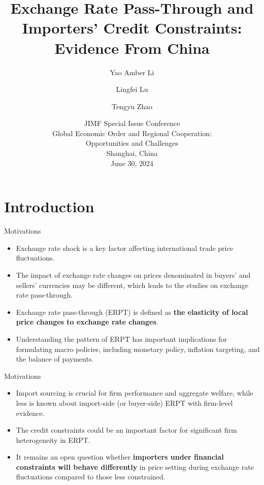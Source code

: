 \documentclass[10pt]{beamer}
\title[ERPT]{Exchange Rate Pass-Through and Importers' Credit Constraints: Evidence From China}
\author[Li \& Lu]{Yao Amber Li\inst{*} \and Lingfei Lu\inst{*} \and Tengyu Zhao\inst{*}}
\institute[2024]{\inst{*} \small The Hong Kong University of Science and Technology}
\date{JIMF Special Issue Conference \\ Global Economic Order and Regional Cooperation:\\ Opportunities and Challenges \\ \vspace{3mm} Shanghai, China \\ \vspace{3mm} June 30, 2024 }
\begin{document}
	
\begin{frame}
    \maketitle
    \centering
\end{frame}


\section{Introduction}

\begin{frame}[label=motivation1]{Motivations}
    \begin{itemize}
	\item Exchange rate shock is a key factor affecting international trade price fluctuations.
        \bigskip
	\item The impact of exchange rate changes on prices denominated in buyers' and sellers' currencies may be different, which leads to the studies on exchange rate pass-through.
        \bigskip
        \item Exchange rate pass-through (ERPT) is defined as \textbf{the elasticity of local price changes to exchange rate changes}.\hyperlink{example_ERPT}{}
        \bigskip
	\item Understanding the pattern of ERPT has important implications for formulating macro policies, including monetary policy, inflation targeting, and the balance of payments.
    \end{itemize}
    
\end{frame}

\begin{frame}[label=motivation2]{Motivations}
    \begin{itemize}
        \item Import sourcing is crucial for firm performance and aggregate welfare, while less is known about import-side (or buyer-side) ERPT with firm-level evidence. 
        \bigskip
	\item The credit constraints could be an important factor for significant firm heterogeneity in ERPT.
        \bigskip
	\item It remains an open question whether \textbf{importers under financial constraints will behave differently} in price setting during exchange rate fluctuations compared to those less constrained.
    \end{itemize}
\end{frame}
\end{document}
